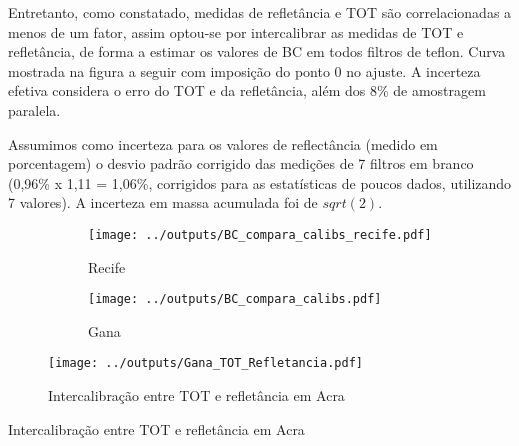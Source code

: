 Entretanto, como constatado, medidas de refletância e TOT são correlacionadas 
a menos de um fator, assim optou-se por intercalibrar as medidas de 
TOT e refletância, de forma a estimar os valores de BC em todos filtros
de teflon. Curva mostrada na figura a seguir com imposição do ponto 0 no ajuste.
A incerteza efetiva considera o erro do TOT e da refletância, além dos 8\% de 
amostragem paralela. 

Assumimos como incerteza para os valores de reflectância (medido em porcentagem)
o desvio padrão corrigido das medições de 7 filtros em branco 
(0,96\% x 1,11 = 1,06\%, corrigidos para as estatísticas de poucos dados, 
utilizando 7 valores). A incerteza em massa acumulada foi de $sqrt(2)$.

\begin{figure}[H]
  \centering
  \begin{subfigure}[b]{0.45\linewidth}
    \texttt{[image: ../outputs/BC\_compara\_calibs\_recife.pdf]}
    \caption{Recife}
  \end{subfigure}%
  \hspace{0.3cm}
  \begin{subfigure}[b]{0.45\linewidth}
    \texttt{[image: ../outputs/BC\_compara\_calibs.pdf]}
    \caption{Gana}
  \end{subfigure}
  \caption{}
\end{figure}

\newpage
\begin{figure}[H]
\begin{center}
  \texttt{[image: ../outputs/Gana\_TOT\_Refletancia.pdf]}
  \caption{Intercalibração entre TOT e refletância em Acra}
\end{center}
\end{figure}

\begin{table}[H]
  \centering
  \small
   
   \caption{Intercalibração entre TOT e refletância em Acra}
\end{table} 


